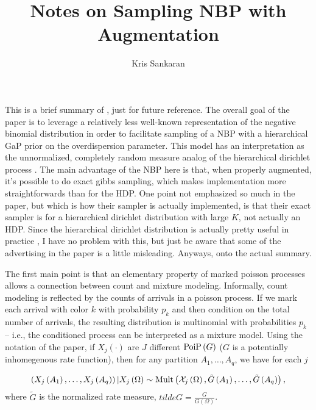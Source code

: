 \documentclass{article}
\title{Notes on Sampling NBP with Augmentation}
\author{Kris Sankaran}
\begin{document}
This is a brief summary of \citep{zhou2012augment}, just for future reference.
The overall goal of the paper is to leverage a relatively less well-known
representation of the negative binomial distribution in order to facilitate
sampling of a NBP with a hierarchical GaP prior on the overdispersion parameter.
This model has an interpretation as the unnormalized, completely random measure
analog of the hierarchical dirichlet process \citep{teh2005sharing}. The main
advantage of the NBP here is that, when properly augmented, it's possible to do
exact gibbs sampling, which makes implementation more straightforwards than for
the HDP. One point not emphasized so much in the paper, but which is how their
sampler is actually implemented, is that their exact sampler is for a
hierarchical dirichlet distribution with large $K$, not actually an HDP. Since
the hierarchical dirichlet distribution is actually pretty useful in practice
\citep{wallach2006topic}, I have no problem with this, but just be aware that
some of the advertising in the paper is a little misleading. Anyways, onto the
actual summary.

The first main point is that an elementary property of marked poisson processes
allows a connection between count and mixture modeling. Informally, count
modeling is reflected by the counts of arrivals in a poisson process. If we mark
each arrival with color $k$ with probability $p_{k}$ and then condition on the
total number of arrivals, the resulting distribution is multinomial with
probabilities $p_{k}$ -- i.e., the conditioned process can be interpreted as a
mixture model. Using the notation of the paper, if $X_{j}\left(\cdot\right)$ are
$J$ different $\textnormal{PoiP}\left(G\right)$ ($G$ is a potentially inhomegenous rate
function), then for any partition $A_{1}, \dots, A_{q}$, we have for each $j$

\begin{align}
  \left(X_{j}\left(A_{1}\right), \dots, X_{j}\left(A_{q}\right)\right) \vert X_{j}\left(\Omega\right) \sim \textnormal{Mult}\left(\mathcal{X}_{j}\left(\Omega\right), \tilde{G}\left(A_{1}\right), \dots, \tilde{G}\left(A_{q}\right)\right),
\end{align}
where $\tilde{G}$ is the normalized rate measure, $tilde{G} =
\frac{G}{G\left(\Omega\right)}$.



\end{document}
